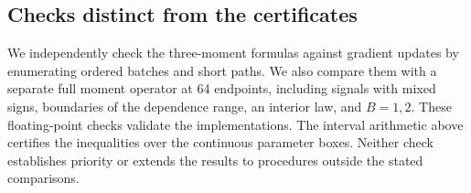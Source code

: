 \subsection{Checks distinct from the certificates}

We independently check the three-moment formulas against gradient updates by
enumerating ordered batches and short paths. We also compare them with a
separate full moment operator at 64 endpoints, including signals with mixed
signs, boundaries of the dependence range, an interior law, and $B = 1,2$.
These floating-point checks validate the implementations. The interval
arithmetic above certifies the inequalities over the continuous parameter boxes.
Neither check establishes priority or extends the results to procedures outside
the stated comparisons.
